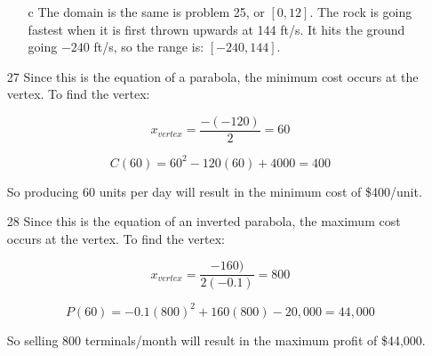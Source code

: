 \documentclass[fleqn,addpoints]{exam}
\begin{document}
\begin{itemize}
\begin{itemize}
\item[c]
The domain is the same is problem 25, or $[0, 12]$.  The rock is going fastest when it is first thrown upwards at 
144 ft/s.  It hits the ground going $-240$ ft/s, so the range is: $[-240, 144]$.

\end{itemize}

\item[27]
Since this is the equation of a parabola, the minimum cost occurs at the vertex.  To find the vertex:

\[
  x_{vertex} = \frac{- (-120)}{2} = 60
\]

\[
  C(60) = 60^2 - 120(60) + 4000 = 400
\]

So producing 60 units per day will result in the minimum cost of \$400/unit.

\item[28]
Since this is the equation of an inverted parabola, the maximum cost occurs at the vertex.  To find the vertex:

\[
  x_{vertex} = \frac{-160)}{2(-0.1)} = 800
\]

\[
  P(60) = -0.1(800)^2 + 160(800) - 20,000 = 44,000
\]

So selling 800 terminals/month will result in the maximum profit of \$44,000.

\end{itemize}
\end{document}
